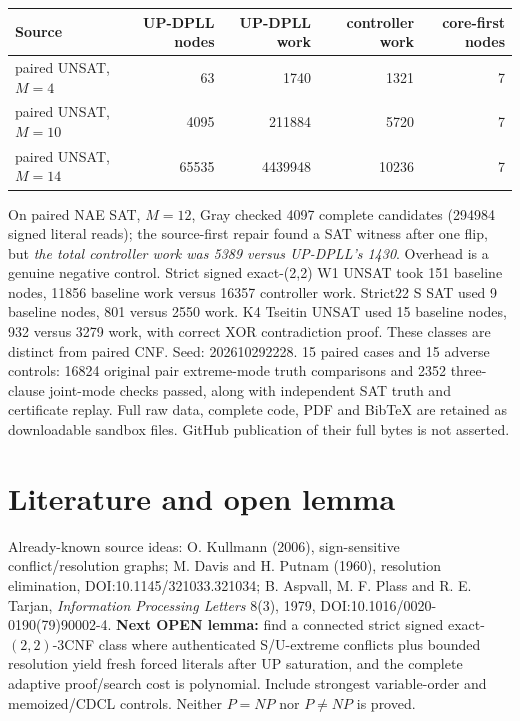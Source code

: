 \documentclass[11pt]{article}
\begin{document}
\begin{center}
\begin{tabular}{lrrrr}
Source & UP-DPLL nodes & UP-DPLL work & controller work & core-first nodes\\
\hline
paired UNSAT, $M=4$ & 63 & 1740 & 1321 & 7\\
paired UNSAT, $M=10$ & 4095 & 211884 & 5720 & 7\\
paired UNSAT, $M=14$ & 65535 & 4439948 & 10236 & 7\\
\end{tabular}
\end{center}
On paired NAE SAT, $M=12$, Gray checked 4097 complete candidates
(294984 signed literal reads); the source-first repair found a
SAT witness after one flip, but \emph{the total controller work was
5389 versus UP-DPLL's 1430}. Overhead is a genuine negative control.
Strict signed exact-(2,2) W1 UNSAT took 151 baseline nodes,
11856 baseline work versus 16357 controller work. Strict22 S SAT
used 9 baseline nodes, 801 versus 2550 work. K4 Tseitin UNSAT
used 15 baseline nodes, 932 versus 3279 work, with correct XOR
contradiction proof. These classes are distinct from paired CNF.
Seed: 202610292228. 15 paired cases and 15 adverse controls:
16824 original pair extreme-mode truth comparisons and 2352
three-clause joint-mode checks passed, along with independent
SAT truth and certificate replay. Full raw data, complete code,
PDF and BibTeX are retained as downloadable sandbox files.
GitHub publication of their full bytes is not asserted.

\section{Literature and open lemma}
Already-known source ideas: O. Kullmann (2006), sign-sensitive
conflict/resolution graphs; M. Davis and H. Putnam (1960),
resolution elimination, DOI:10.1145/321033.321034;
B. Aspvall, M. F. Plass and R. E. Tarjan,
\emph{Information Processing Letters} 8(3), 1979,
DOI:10.1016/0020-0190(79)90002-4.
\textbf{Next OPEN lemma:} find a connected strict signed
exact-$(2,2)$-3CNF class where authenticated S/U-extreme conflicts
plus bounded resolution yield fresh forced literals after UP
saturation, and the complete adaptive proof/search cost is
polynomial. Include strongest variable-order and memoized/CDCL
controls. Neither $P=NP$ nor $P\ne NP$ is proved.
\end{document}
